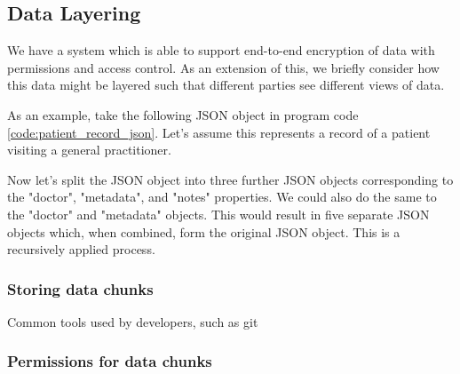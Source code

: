 \subsection{Data Layering}

We have a system which is able to support end-to-end encryption of data with permissions and access control. As an extension of this, we briefly consider how this data might be layered such that different parties see different views of data.

As an example, take the following JSON object in program code \ref{code:patient_record_json}. Let's assume this represents a record of a patient visiting a general practitioner.



Now let's split the JSON object into three further JSON objects corresponding to the "doctor", "metadata", and "notes" properties. We could also do the same to the "doctor" and "metadata" objects. This would result in five separate JSON objects which, when combined, form the original JSON object. This is a recursively applied process.

\subsubsection{Storing data chunks}

Common tools used by developers, such as git

\subsubsection{Permissions for data chunks}
